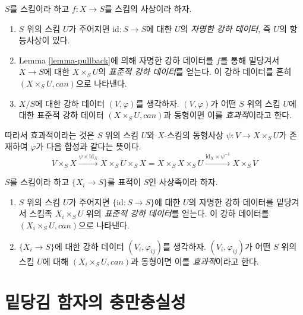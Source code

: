 \begin{definition}
\label{definition-effective}
$S$를 스킴이라 하고 $f : X \to S$를 스킴의 사상이라 하자.
\begin{enumerate}
\item $S$ 위의 스킴 $U$가 주어지면 $\text{id} : S \to S$에 대한
$U$의 {\it 자명한 강하 데이터}, 즉 $U$의 항등사상이 있다.
\item Lemma \ref{lemma-pullback}에 의해 자명한 강하 데이터를 $f$를
통해 밑당겨서 $X \to S$에 대한 $X \times_S U$의
{\it 표준적 강하 데이터}를 얻는다. 이 강하 데이터를 흔히
$(X \times_S U, can)$으로 나타낸다.
\item $X/S$에 대한 강하 데이터 $(V, \varphi)$를 생각하자.
$(V, \varphi)$가 어떤 $S$ 위의 스킴 $U$에 대한 표준적 강하 데이터
$(X \times_S U, can)$과 동형이면 이를 {\it 효과적}이라고 한다.
\end{enumerate}
\end{definition}

\noindent
따라서 효과적이라는 것은 $S$ 위의 스킴 $U$와 $X$-스킴의 동형사상
$\psi : V \to X \times_S U$가 존재하여 $\varphi$가 다음 합성과
같다는 뜻이다.
$$
V \times_S X \xrightarrow{\psi \times \text{id}_X}
X \times_S U \times_S X =
X \times_S X \times_S U
\xrightarrow{\text{id}_X \times \psi^{-1}}
X \times_S V
$$

\begin{definition}
\label{definition-effective-family}
$S$를 스킴이라 하고 $\{X_i \to S\}$를 표적이 $S$인 사상족이라 하자.
\begin{enumerate}
\item $S$ 위의 스킴 $U$가 주어지면 $\{\text{id} : S \to S\}$에 대한
$U$의 자명한 강하 데이터를 밑당겨서 스킴족 $X_i \times_S U$ 위의
{\it 표준적 강하 데이터}를 얻는다. 이 강하 데이터를
$(X_i \times_S U, can)$으로 나타낸다.
\item $\{X_i \to S\}$에 대한 강하 데이터 $(V_i, \varphi_{ij})$를
생각하자. $(V_i, \varphi_{ij})$가 어떤 $S$ 위의 스킴 $U$에 대해
$(X_i \times_S U, can)$과 동형이면 이를 {\it 효과적}이라고 한다.
\end{enumerate}
\end{definition}












\section{밑당김 함자의 충만충실성}
\label{section-fully-faithful}

